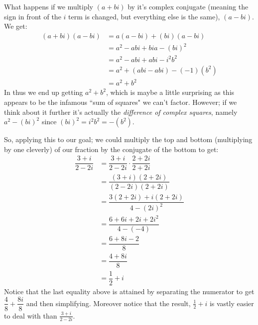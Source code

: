 \documentclass{ximeraXloud}
\begin{document}
\begin{example}
    What happens if we multiply $(a + bi)$ by it's complex conjugate (meaning the sign in front of the $i$ term is changed, but everything else is the same), $(a - bi)$. We get:
    \begin{align*}
        (a+bi)(a-bi)    & = a(a-bi) + (bi)(a-bi)                 \\
                        & = a^2 - abi + bia - (bi)^2             \\
                        & = a^2 - abi + abi - i^2b^2             \\
                        & = a^2 + (abi - abi) - (-1)(b^2)        \\
                        & = a^2 + b^2
    \end{align*}
    In thus we end up getting $a^2 + b^2$, which is maybe a little surprising as this appears to be the infamous ``sum of squares" we can't factor. However; if we think about it further it's actually the \textit{difference of complex squares}, namely $a^2 - (bi)^2$ since $(bi)^2 = i^2b^2 = -(b^2)$.
    
    So, applying this to our goal; we could multiply the top and bottom (multiplying by one cleverly) of our fraction by the conjugate of the bottom to get:
    \begin{align*}
        \dfrac{3+ i}{2 - 2i}    & = \dfrac{3+ i}{2 - 2i} \cdot \dfrac{2 + 2i}{2 + 2i}      \\
                                & = \dfrac{(3+i)(2 + 2i)}{(2-2i)(2+2i)}                    \\
                                & = \dfrac{3(2 + 2i) + i(2 + 2i)}{4 - (2i)^2}              \\
                                & = \dfrac{6 + 6i + 2i +2i^2}{4 - (-4)}                    \\
                                & = \dfrac{6 + 8i -2}{8}                                   \\
                                & = \dfrac{4 + 8i}{8}                                      \\
                                & = \dfrac{1}{2} + i                                                             
    \end{align*}
    Notice that the last equality above is attained by separating the numerator to get $\dfrac{4}{8} + \dfrac{8i}{8}$ and then simplifying. Moreover notice that the result, $\frac{1}{2} + i$ is vastly easier to deal with than $\frac{3 + i}{2 - 2i}$.
    
    
\end{example}%
\end{document}
